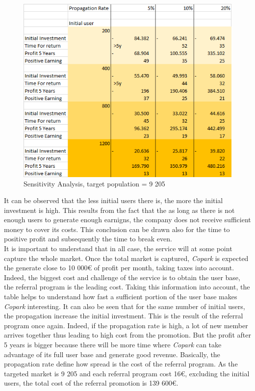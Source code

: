 \documentclass[12pt,a4paper,oneside]{book}
\newcommand{\bp}{\textit{Copark }}
\begin{document}
\begin{figure}[h]
\centering
\caption{Sensitivity Analysis, target population = 9 205}
\label{sapg}
\includegraphics[keepaspectratio=true,width=\textwidth-2cm]{../images/sensitivity10.png}
\end{figure}

It can be observed that the less initial users there is, the more the initial investment is high. This results from the fact that the as long as there is not enough users to generate enough earnigns, the company does not receive sufficient money to cover its costs. This conclusion can be drawn also for the time to positive profit and subsequently the time to break even.\\

It is important to understand that in all case, the service will at some point capture the whole market. Once the total market is captured, \bp is expected the generate close to 10 000\euro{} of profit per month, taking taxes into account. Indeed, the biggest cost and challenge of the service is to obtain the user base, the referral program is the leading cost. Taking this information into account, the table helps to understand how fast a sufficient portion of the user base makes \bp interesting. It can also be seen that for the same number of initial users, the propagation increase the initial investment. This is the result of the referral program once again. Indeed, if the propagation rate is high, a lot of  new member arrives together thus leading to high cost from the promotion. But the profit after 5 years is bigger because there will be more time where \bp can take advantage of its full user base and generate good revenue. Basically, the propagation rate define how spread is the cost of the referral program. As the targeted market is 9 205 and each referral program cost 16\euro{}, excluding the initial users, the total cost of the referral promotion is 139 600\euro{}.\\
\end{document}
